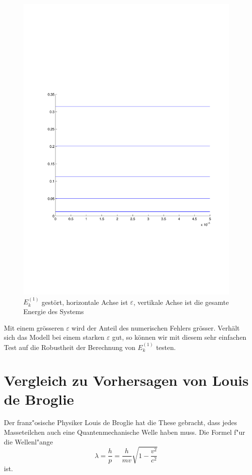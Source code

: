 \begin{refsection}
\begin{figure}
 \centering
 \includegraphics[width=12cm,clip=true,trim=2cm 7cm 1cm 8cm]{efeld/Energie_gestoert.pdf}
 \caption{$E_k^{(1)}$ gest\"ort, horizontale Achse ist $\varepsilon$, vertikale Achse ist die gesamte Energie des Systems}
 \label{abb:efeld_E_gestoert}
\end{figure}

Mit einem gr\"osseren $\varepsilon$ wird der Anteil des numerischen Fehlers gr\"osser.
Verh\"alt sich das Modell bei einem starken $\varepsilon$ gut, so k\"onnen wir mit diesem sehr einfachen Test
auf die Robustheit der Berechnung von $E_k^{(1)}$ testen.


\section{Vergleich zu Vorhersagen von Louis de Broglie}
Der franz"osische Physiker Louis de Broglie hat die These gebracht,
dass jedes Masseteilchen auch eine Quantenmechanische Welle haben muss.
Die Formel f"ur die Wellenl"ange
\begin{equation}
  \label{efeld:eq_deBroglie}
  \lambda = \frac{h}{p} = \frac {h}{{m}{v}} \sqrt{1 - \frac{v^2}{c^2}}
\end{equation}
ist.


\end{refsection}
